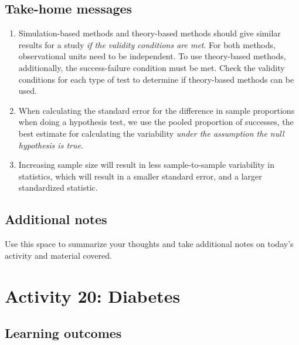 \documentclass[
]{report}
\begin{document}
\vspace{0.4in}

\vspace{.8in}

\subsection{Take-home messages}\label{take-home-messages-18}

\begin{enumerate}
\def\labelenumi{\arabic{enumi}.}
\item
  Simulation-based methods and theory-based methods should give similar results for a study \emph{if the validity conditions are met}. For both methods, observational units need to be independent. To use theory-based methods, additionally, the success-failure condition must be met. Check the validity conditions for each type of test to determine if theory-based methods can be used.
\item
  When calculating the standard error for the difference in sample proportions when doing a hypothesis test, we use the pooled proportion of successes, the best estimate for calculating the variability \emph{under the assumption the null hypothesis is true}.
\item
  Increasing sample size will result in less sample-to-sample variability in statistics, which will result in a smaller standard error, and a larger standardized statistic.
\end{enumerate}

\subsection{Additional notes}\label{additional-notes-18}

Use this space to summarize your thoughts and take additional notes on today's activity and material covered.

\newpage

\section{Activity 20: Diabetes}\label{activity-20-diabetes}


\subsection{Learning outcomes}\label{learning-outcomes-21}
\end{document}
